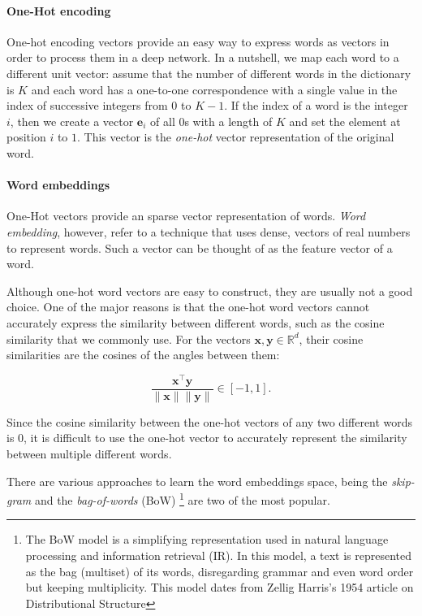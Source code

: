 \paragraph{One-Hot encoding}
One-hot encoding vectors provide an easy way to express words as vectors in order to process them in a deep network. In a nutshell, we map each word to a different unit vector: assume that the number of different words in the dictionary is $K$ and each word has a one-to-one correspondence with a single value in the index of successive integers from 0 to $K-1$. If the index of a word is the integer $i$, then we create a vector $\mathbf{e}_i$ of all 0s with a length of $K$ and set the element at position $i$ to $1$. This vector is the \textit{one-hot} vector representation of the original word. 

\paragraph{Word embeddings}\label{subsubsubsec:}

One-Hot vectors provide an sparse vector representation of words. \textit{Word embedding}, however, refer to a technique that uses dense, vectors of real numbers to represent words. Such a vector can be thought of as the feature vector of a word.  

Although one-hot word vectors are easy to construct, they are usually not a good choice. One of the major reasons is that the one-hot word vectors cannot accurately express the similarity between different words, such as the cosine similarity that we commonly use. For the vectors $\mathbf{x}, \mathbf{y} \in \mathbb{R}^d$, their cosine similarities are the cosines of the angles between them:

$$\frac{\mathbf{x}^\top \mathbf{y}}{\|\mathbf{x}\| \|\mathbf{y}\|} \in [-1, 1].$$

Since the cosine similarity between the one-hot vectors of any two different words is 0, it is difficult to use the one-hot vector to accurately represent the similarity between multiple different words.

There are various approaches to learn the word embeddings space, being the \textit{skip-gram}\citep{Mikolov2013} and the \textit{bag-of-words} (BoW) \footnote{The BoW model is a simplifying representation used in natural language processing and information retrieval (IR). In this model, a text is represented as the bag (multiset) of its words, disregarding grammar and even word order but keeping multiplicity. This model dates from Zellig Harris's 1954 article on Distributional Structure} are two of the most popular. 

